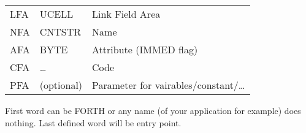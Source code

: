\clearpage
{}\label{uvocab}

\begin{tabular}{l l l}
LFA & UCELL & Link Field Area \\
NFA & CNTSTR & Name \\
AFA & BYTE & Attribute (IMMED flag) \\
CFA & \ldots & Code \\
PFA & (optional) & Parameter for vairables/constant/\ldots\\
\end{tabular}
\medskip\noindent
First word can be FORTH or any name (of your application for example) does
nothing. Last defined word will be entry point.
